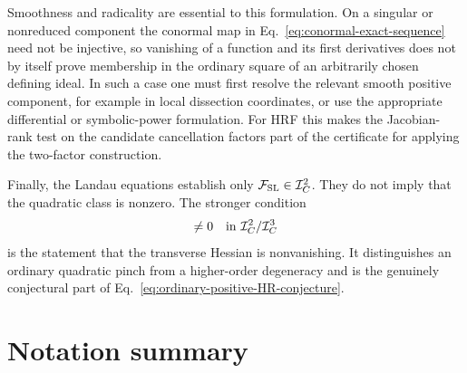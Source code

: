 \documentclass[a4paper,11pt]{article}
\newcommand{\FSL}{\mathcal F_{\rm SL}}
\newcommand{\ideal}{\mathcal I}
\begin{document}
Smoothness and radicality are essential to this formulation.  On a singular
or nonreduced component the conormal map in
Eq.~\eqref{eq:conormal-exact-sequence} need not be injective, so vanishing of
a function and its first derivatives does not by itself prove membership in
the ordinary square of an arbitrarily chosen defining ideal.  In such a case
one must first resolve the relevant smooth positive component, for example in
local dissection coordinates, or use the appropriate differential or
symbolic-power formulation.  For HRF this makes the Jacobian-rank test on the
candidate cancellation factors part of the certificate for applying the
two-factor construction.

Finally, the Landau equations establish only
\(\FSL\in\ideal_C^2\).  They do not imply that the quadratic class is
nonzero.  The stronger condition
\begin{equation}
 [\FSL]\ne0\quad\hbox{in }\ideal_C^2/\ideal_C^3
 \label{eq:nonzero-quadratic-class}
\end{equation}
is the statement that the transverse Hessian is nonvanishing.  It
distinguishes an ordinary quadratic pinch from a higher-order degeneracy and
is the genuinely conjectural part of Eq.~\eqref{eq:ordinary-positive-HR-conjecture}.

\endgroup
\section{Notation summary}
\end{document}
